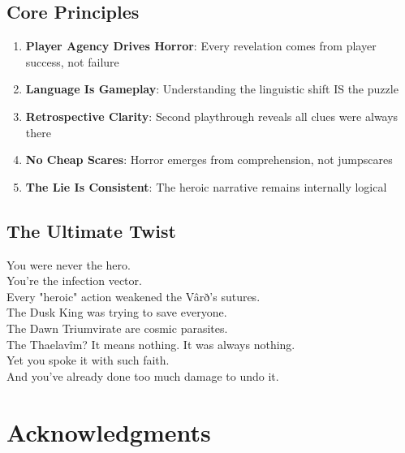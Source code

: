\documentclass[11pt,a4paper,twoside]{book}
\begin{document}
\section{Core Principles}

\begin{enumerate}
    \item \textbf{Player Agency Drives Horror}: Every revelation comes from player success, not failure
    \item \textbf{Language Is Gameplay}: Understanding the linguistic shift IS the puzzle
    \item \textbf{Retrospective Clarity}: Second playthrough reveals all clues were always there
    \item \textbf{No Cheap Scares}: Horror emerges from comprehension, not jumpscares
    \item \textbf{The Lie Is Consistent}: The heroic narrative remains internally logical
\end{enumerate}

\section{The Ultimate Twist}

\begin{tcolorbox}[horrorbox={The Final Truth}]
\centering
\Large
You were never the hero.\\
\vspace{0.5em}
\normalsize
You're the infection vector.\\
\vspace{1em}
Every "heroic" action weakened the Vârð's sutures.\\
The Dusk King was trying to save everyone.\\
The Dawn Triumvirate are cosmic parasites.\\
\vspace{1em}
The Thaelavîm? It means nothing. It was always nothing.\\
Yet you spoke it with such faith.\\
\vspace{1em}
And you've already done too much damage to undo it.
\end{tcolorbox}

\backmatter

\chapter*{Acknowledgments}
\end{document}
